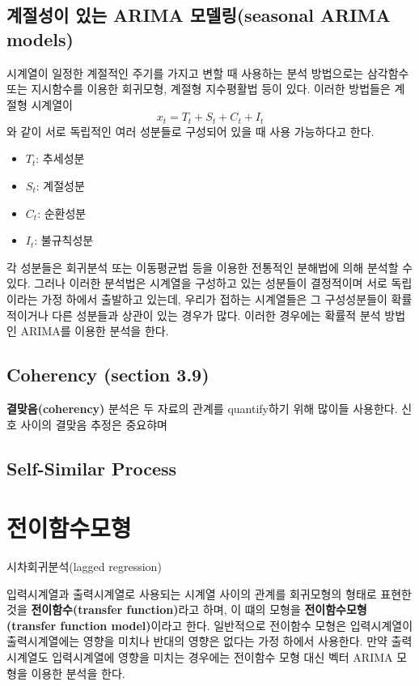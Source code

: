 \documentclass[b5paper,]{scrbook}
\theoremstyle{plain}
\theoremstyle{definition}
\numberwithin{equation}{section}
\begin{document}
\section{계절성이 있는 ARIMA 모델링(seasonal ARIMA
models)}\label{--arima-seasonal-arima-models}

시계열이 일정한 계절적인 주기를 가지고 변할 때 사용하는 분석 방법으로는
삼각함수 또는 지시함수를 이용한 회귀모형, 계절형 지수평활법 등이 있다.
이러한 방법들은 계절형 시계열이 \[x_{t}=T_{t}+S_{t}+C_{t}+I_{t}\] 와
같이 서로 독립적인 여러 성분들로 구성되어 있을 때 사용 가능하다고 한다.

\begin{itemize}
\item
  \(T_{t}\): 추세성분
\item
  \(S_{t}\): 계절성분
\item
  \(C_{t}\): 순환성분
\item
  \(I_{t}\): 불규칙성분
\end{itemize}

각 성분들은 회귀분석 또는 이동평균법 등을 이용한 전통적인 분해법에 의해
분석할 수 있다. 그러나 이러한 분석법은 시계열을 구성하고 있는 성분들이
결정적이며 서로 독립이라는 가정 하에서 출발하고 있는데, 우리가 접하는
시계열들은 그 구성성분들이 확률적이거나 다른 성분들과 상관이 있는 경우가
많다. 이러한 경우에는 확률적 분석 방법인 ARIMA를 이용한 분석을 한다.

\section{Coherency (section 3.9)}\label{coherency-section-3.9}

\textbf{결맞음(coherency)} 분석은 두 자료의 관계를 quantify하기 위해
많이들 사용한다. 신호 사이의 결맞음 추정은 중요햐며

\section{Self-Similar Process}\label{self-similar-process}

\chapter{전이함수모형}\label{transfer}

시차회귀분석(lagged regression)

입력시계열과 출력시계열로 사용되는 시계열 사이의 관계를 회귀모형의
형태로 표현한 것을 \textbf{전이함수(transfer function)}라고 하며, 이
떄의 모형을 \textbf{전이함수모형(transfer function model)}이라고 한다.
일반적으로 전이함수 모형은 입력시계열이 출력시계열에는 영향을 미치나
반대의 영향은 없다는 가정 하에서 사용한다. 만약 출력시계열도
입력시계열에 영향을 미치는 경우에는 전이함수 모형 대신 벡터 ARIMA 모형을
이용한 분석을 한다.
\end{document}
